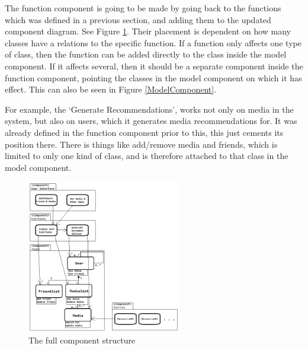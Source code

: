 The function component is going to be made by going back to the functions which was defined in a previous section, and adding them to the updated component diagram. See Figure \ref{FullComponents}. Their placement is dependent on how many classes have a relations to the specific function. If a function only affects one type of class, then the function can be added directly to the class inside the model component. If it affects several, then it should be a separate component inside the function component, pointing the classes in the model component on which it has effect. This can also be seen in Figure \ref{ModelComponent}.

For example, the ‘Generate Recommendations’, works not only on media in the system, but also on users, which it generates media recommendations for. It was already defined in the function component prior to this, this just cements its position there. There is things like add/remove media and friends, which is limited to only one kind of class, and is therefore attached to that class in the model component.

\begin{figure}[htb]
\centering
\includegraphics[width=0.6\textwidth]{Images/FullComponents.png}
\caption{The full component structure}
\label{FullComponents}
\end{figure}